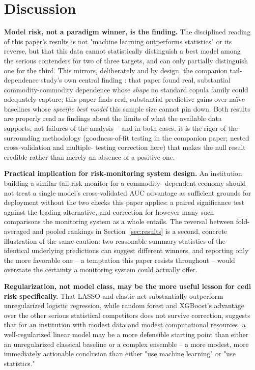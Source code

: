 \documentclass[final,3p,times,authoryear]{elsarticle}
\begin{document}
\section{Discussion}
\label{sec:discussion}

\textbf{Model risk, not a paradigm winner, is the finding.} The
disciplined reading of this paper's results is not "machine learning
outperforms statistics" or its reverse, but that this data cannot
statistically distinguish a best model among the serious contenders for
two of three targets, and can only partially distinguish one for the
third. This mirrors, deliberately and by design, the companion tail-
dependence study's own central finding \citep{nelson2026tail}: that
paper found real, substantial commodity-commodity dependence whose
\emph{shape} no standard copula family could adequately capture; this
paper finds real, substantial predictive gains over na\"ive baselines
whose \emph{specific best model} this sample size cannot pin down. Both
results are properly read as findings about the limits of what the
available data supports, not failures of the analysis -- and in both
cases, it is the rigor of the surrounding methodology (goodness-of-fit
testing in the companion paper; nested cross-validation and multiple-
testing correction here) that makes the null result credible rather
than merely an absence of a positive one.

\textbf{Practical implication for risk-monitoring system design.} An
institution building a similar tail-risk monitor for a commodity-
dependent economy should not treat a single model's cross-validated AUC
advantage as sufficient grounds for deployment without the two checks
this paper applies: a paired significance test against the leading
alternative, and correction for however many such comparisons the
monitoring system as a whole entails. The reversal between fold-averaged
and pooled rankings in Section~\ref{sec:results} is a second, concrete
illustration of the same caution: two reasonable summary statistics of
the identical underlying predictions can suggest different winners, and
reporting only the more favorable one -- a temptation this paper resists
throughout -- would overstate the certainty a monitoring system could
actually offer.

\textbf{Regularization, not model class, may be the more useful lesson
for cedi risk specifically.} That LASSO and elastic net substantially
outperform unregularized logistic regression, while random forest and
XGBoost's advantage over the other serious statistical competitors does
not survive correction, suggests that for an institution with modest
data and modest computational resources, a well-regularized linear model
may be a more defensible starting point than either an unregularized
classical baseline or a complex ensemble -- a more modest, more
immediately actionable conclusion than either "use machine learning" or
"use statistics."
\end{document}
